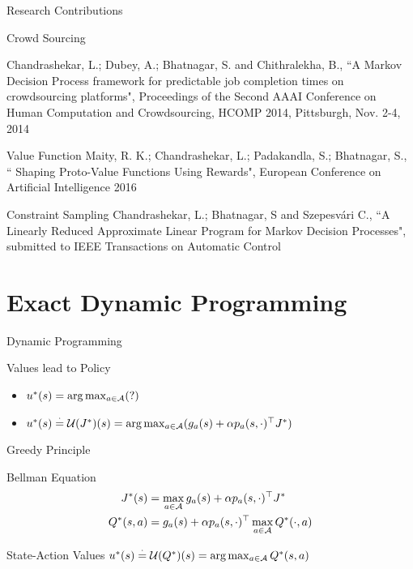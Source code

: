 \documentclass[10pt,handout]{beamer}
\begin{document}
\begin{frame}[fragile]{Research Contributions}
\begin{block}{Crowd Sourcing}

Chandrashekar, L.;  Dubey, A.; Bhatnagar, S. and Chithralekha, B., ``A Markov Decision Process framework for predictable job completion times on crowdsourcing platforms", Proceedings of the Second {AAAI} Conference on Human Computation and Crowdsourcing, {HCOMP} 2014, Pittsburgh, Nov. 2-4, 2014
\end{block}
\begin{block}{Value Function}
Maity, R. K.; Chandrashekar, L.;  Padakandla, S.; Bhatnagar, S., `` Shaping Proto-Value Functions Using Rewards", European Conference on Artificial Intelligence 2016\\
\end{block}
\begin{block}{Constraint Sampling}
Chandrashekar, L.;  Bhatnagar, S and Szepesv\'{a}ri C., ``A Linearly Reduced Approximate Linear Program for Markov Decision Processes", submitted to IEEE Transactions on Automatic Control
\end{block}

\end{frame}



\section{Exact Dynamic Programming}


\begin{frame}[fragile]{Dynamic Programming}
\begin{block}{Values lead to Policy}
\begin{itemize}
\item$u^*(s)=\arg\max_{a\in \mathcal{A}}(?)$
\item $u^*(s)\stackrel{\cdot}{=} \mathcal{U}(J^*)(s) =\arg\max_{a\in \mathcal{A}} (g_a(s)+\alpha p_a(s,\cdot)^\top J^*)$
\end{itemize}
\end{block}
\begin{block}{Greedy Principle}
{\color{orange}{Best = Current Best+ Future Best}}
\end{block}
\begin{block}{Bellman Equation}
\begin{align*}
J^*(s)&=\max_{a\in \mathcal{A}} g_a(s)+\alpha p_a(s,\cdot)^\top J^*\\
Q^*(s,a)&= g_a(s)+\alpha p_a(s,\cdot)^\top \max_{a\in \mathcal{A}} Q^*(\cdot,a)
\end{align*}
\end{block}
\begin{block}{State-Action Values}
$u^*(s)\stackrel{\cdot}{=} \mathcal{U}(Q^*)(s) =\arg\max_{a\in \mathcal{A}} Q^*(s,a)$
\end{block}


\end{frame}
\end{document}
